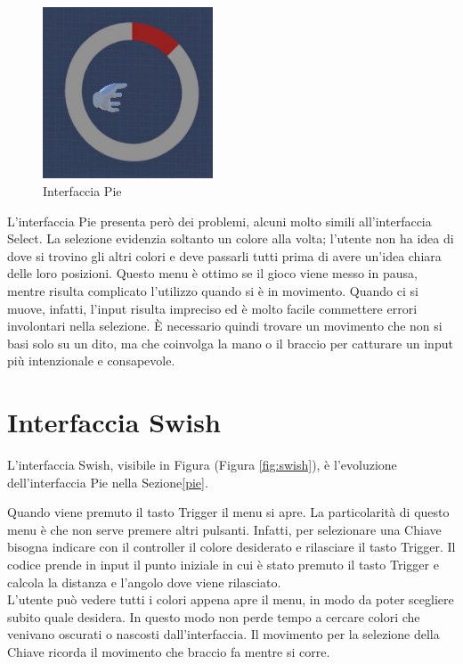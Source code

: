 \documentclass[target=bach,aauheader=]{thud}
\begin{document}
\begin{figure}[h]
    \centering
    \includegraphics[width=0.45\textwidth]{pie}
    \caption{Interfaccia Pie}
    \label{fig:pie}
\end{figure}

L'interfaccia Pie presenta però dei problemi, alcuni molto simili all'interfaccia Select.
La selezione evidenzia soltanto un colore alla volta; l'utente non ha idea di dove si trovino gli altri colori e deve passarli tutti prima di avere un'idea chiara delle loro posizioni.  
Questo menu è ottimo se il gioco viene messo in pausa, mentre risulta complicato l'utilizzo quando si è in movimento.
Quando ci si muove, infatti, l'input risulta impreciso ed è molto facile commettere errori involontari nella selezione.
È necessario quindi trovare un movimento che non si basi solo su un dito, ma che coinvolga la mano o il braccio per catturare un input più intenzionale e consapevole.

\section{Interfaccia Swish} %
\label{swish}
L'interfaccia Swish, visibile in Figura (Figura \ref{fig:swish}), è l'evoluzione dell'interfaccia Pie nella Sezione\ref{pie}.

Quando viene premuto il tasto Trigger il menu si apre.
La particolarità di questo menu è che non serve premere altri pulsanti.
Infatti, per selezionare una Chiave bisogna indicare con il controller il colore desiderato e rilasciare il tasto Trigger.
Il codice prende in input il punto iniziale in cui è stato premuto il tasto Trigger e calcola la distanza e l'angolo dove viene rilasciato. \\

L'utente può vedere tutti i colori appena apre il menu, in modo da poter scegliere subito quale desidera.
In questo modo non perde tempo a cercare colori che venivano oscurati o nascosti dall'interfaccia.
Il movimento per la selezione della Chiave ricorda il movimento che braccio fa mentre si corre.
\end{document}
